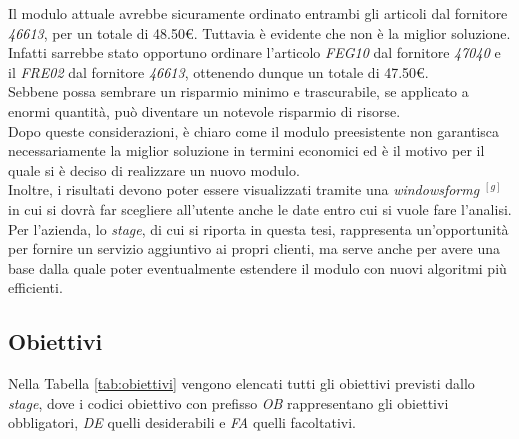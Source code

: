 \noindent Il modulo attuale avrebbe sicuramente ordinato entrambi gli articoli dal fornitore \textit{46613},
per un totale di 48.50€. Tuttavia è evidente che non è la miglior soluzione.
Infatti sarrebbe stato opportuno ordinare l'articolo \textit{FEG10} dal fornitore \textit{47040} e il
\textit{FRE02} dal fornitore \textit{46613}, ottenendo dunque un totale di 47.50€.\\
Sebbene possa sembrare un risparmio minimo e trascurabile, se applicato a enormi quantità, può
diventare un notevole risparmio di risorse.\\

\noindent Dopo queste considerazioni, è chiaro come il modulo preesistente non garantisca necessariamente la miglior soluzione in termini economici ed è il motivo per il quale
si è deciso di realizzare un nuovo modulo.\\

\noindent Inoltre, i risultati devono poter essere visualizzati tramite una \textit{\gls{windowsformg}} $^{[g]}$ in cui si dovrà far scegliere all'utente
anche le date entro cui si vuole fare l'analisi.\\

\noindent Per l'azienda, lo \textit{stage}, di cui si riporta in questa tesi, rappresenta un'opportunità per fornire un servizio aggiuntivo ai propri clienti, ma serve anche per avere una base
dalla quale poter eventualmente estendere il modulo con nuovi algoritmi più efficienti.
\newpage
\subsection{Obiettivi}
\label{sec:obiettivi}
\noindent Nella Tabella \ref{tab:obiettivi} vengono elencati tutti gli obiettivi previsti dallo \textit{stage}, dove
i codici obiettivo con prefisso \textit{OB} rappresentano gli obiettivi obbligatori, \textit{DE} quelli desiderabili
e \textit{FA} quelli facoltativi.

\renewcommand{\arraystretch}{1.55}

